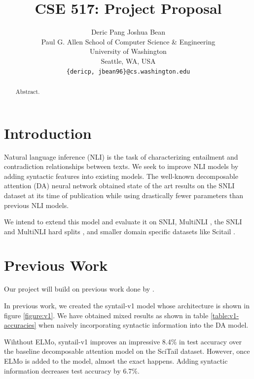 \documentclass[11pt,a4paper]{article}
\title{CSE 517: Project Proposal}
\author{
  Deric Pang \quad
  Joshua Bean \\
  Paul G. Allen School of Computer Science \& Engineering \\
  University of Washington \\
  Seattle, WA, USA \\
  {\tt \{dericp, jbean96\}@cs.washington.edu} \\
}
\date{}
\begin{document}
\maketitle
\begin{abstract}
  Abstract.
\end{abstract}

\section{Introduction}

Natural language inference (NLI) is the task of characterizing entailment and
contradiction relationships between texts.
We seek to improve NLI models by adding syntactic
features into existing models. The well-known decomposable attention (DA)
neural network \citep{Parikh2016-em} obtained state of the art results on the
SNLI \citep{Bowman2015-is} dataset at its time of publication while using
drastically fewer parameters than previous NLI models.

We intend to extend this
model and evaluate it on SNLI, MultiNLI \citep{Williams2017-uh}, the SNLI and
MultiNLI hard splits \citep{Gururangan2018-lj}, and smaller domain specific
datasets like Scitail \citep{Khot2018-th}.

\section{Previous Work}

Our project will build on previous work done by \citet{Pang2018-syntail}.

In previous work, we created the syntail-v1 model whose architecture is
shown in figure \ref{figure:v1}.
We have obtained mixed results as shown in table \ref{table:v1-accuracies} when
naively incorporating syntactic information
into the DA model.

Wihthout ELMo, syntail-v1 improves an impressive 8.4\% in test accuracy over
the baseline decomposable attention model on the SciTail dataset. However,
once ELMo is added to the model, almost the exact happens. Adding syntactic
information decreases test accuracy by 6.7\%.

\begin{table}[h]
  \caption{Syntail-v1 and DA model accuracies on the SciTail dataset.}
\label{table:v1-accuracies}
\end{table}
\end{document}
